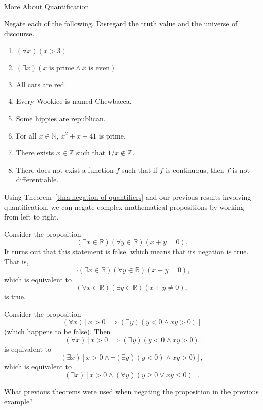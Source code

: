 \begin{section}{More About Quantification}
\begin{exercise}
Negate each of the following.  Disregard the truth value and the universe of discourse.
\begin{enumerate}
\item $(\forall x)(x>3)$
\item $(\exists x)(x \mbox{ is prime}\wedge x \mbox{ is even})$
\item All cars are red.
\item Every Wookiee is named Chewbacca.
\item Some hippies are republican.
\item For all $x\in\mathbb{N}$, $x^2+x+41$ is prime.
\item There exists $x\in\mathbb{Z}$ such that $1/x\notin\mathbb{Z}$.
\item There does not exist a function $f$ such that if $f$ is continuous, then $f$ is not differentiable.
\end{enumerate}
\end{exercise}

Using Theorem~\ref{thm:negation of quantifiers} and our previous results involving quantification, we can negate complex mathematical propositions by working from left to right.

\begin{example}
Consider the proposition
\[
(\exists x\in\mathbb{R})(\forall y\in\mathbb{R})(x+y=0).
\]
It turns out that this statement is false, which means that its negation is true.  That is,
\[
\neg(\exists x\in\mathbb{R})(\forall y\in\mathbb{R})(x+y=0),
\]
which is equivalent to
\[
(\forall x\in\mathbb{R})(\exists y\in\mathbb{R})(x+y\neq 0),
\]
is true.
\end{example}

\begin{example}
Consider the proposition
\[
(\forall x)[x>0\implies (\exists y)(y<0 \wedge xy>0)]
\]
(which happens to be false).  Then
\[
\neg (\forall x)[x>0\implies (\exists y)(y<0 \wedge xy>0)]
\]
is equivalent to
\[
(\exists x)[x>0 \wedge \neg (\exists y)(y<0) \wedge xy>0)],
\]
which is equivalent to 
\[
(\exists x)[x>0 \wedge (\forall y)(y\geq 0 \vee xy\leq 0)].
\]
\end{example}

\begin{exercise}
What previous theorems were used when negating the proposition in the previous example?
\end{exercise}


\end{section}
